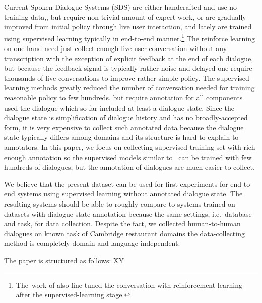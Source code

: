 \documentclass[runningheads,a4paper]{llncs}
\begin{document}
Current Spoken Dialogue Systems (SDS) are either handcrafted and use no training data\cite{duvsek2014alex},\cite{raux2005let}, but require non-trivial amount of expert work, or are gradually improved from initial policy through live user interaction\cite{young2010hidden,gasic2011line}, and lately are trained using supervised learning typically in end-to-end manner\cite{wen2016network,williams2016end}.\footnote{The~work of \cite{williams2016end} also fine tuned the conversation with reinforcement learning after the supervised-learning stage.}
The reinforce learning on one hand need just collect enough live user conversation without any transcription with the exception of explicit feedback at the end of each dialogue, but because the feedback signal is typically rather noise and delayed one require thousands of live conversations to improve rather simple policy.\cite{gasic2011line}
The supervised-learning methods greatly reduced the number of conversation needed for training reasonable policy to few hundreds\cite{wen2016network}, but require annotation for all components used the dialogue which so far included at least a dialogue state\cite{wen2016network, young2010hidden}.
Since the dialogue state is simplification of dialogue history and has no broadly-accepted form, it is very expensive to collect such annotated data because the dialogue state typically differs among domains and its structure is hard to explain to annotators.
In this paper, we focus on collecting supervised training set with rich enough annotation so the supervised models similar to~\cite{wen2016network} can be trained with few hundreds of dialogues, but the annotation of dialogues are much easier to collect.

We believe that the present dataset can be used for first experiments for end-to-end systems using supervised learning without annotated dialogue state.
The resulting systems should be able to roughly compare to systems trained on datasets with \cite{williams2013dstc1, henderson2014dstc2, henderson2014dstc3} dialogue state annotation because the same settings, i.e.\ database and task, for data collection.
Despite the fact, we collected human-to-human dialogues on known task of Cambridge restaurant domains the data-collecting method is completely domain and language independent.

The paper is structured as follows:
XY

\end{document}
